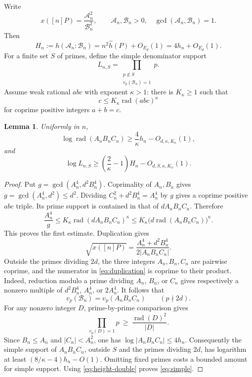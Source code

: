 \documentclass[11pt,a4paper]{article}
\newtheorem{lemma}[theorem]{Lemma}
\DeclareMathOperator{\rad}{rad}
\begin{document}
Write
\[
 x([n]P)=\frac{\mathcal A_n^2}{\mathcal B_n^2},\qquad
 \mathcal A_n,\mathcal B_n>0,\quad
 \gcd(\mathcal A_n,\mathcal B_n)=1.
\]
Then
\begin{equation}\label{eq:height-double}
 H_n:=h(\mathcal A_n:\mathcal B_n)
    =n^2\widehat h(P)+O_{E_d}(1)=4h_n+O_{E_d}(1).
\end{equation}
For a finite set $S$ of primes, define the simple denominator support
\[
                 L_{n,S}=\prod_{\substack{p\notin S\\v_p(\mathcal B_n)=1}}p.
\]
Assume weak rational $abc$ with exponent $\kappa>1$: there is
$K_\kappa\ge1$ such that
\[
 c\le K_\kappa\rad(abc)^\kappa
\]
for coprime positive integers $a+b=c$.

\begin{lemma}\label{lem:radical}
Uniformly in $n$,
\[
 \log\rad(A_nB_nC_n)\ge\frac4\kappa h_n
                              -O_{d,\kappa,K_\kappa}(1),
\]
and
\begin{equation}\label{eq:simple}
 \log L_{n,S}\ge\left(\frac2\kappa-1\right)H_n
                              -O_{d,S,\kappa,K_\kappa}(1).
\end{equation}
\end{lemma}
\begin{proof}
Put $g=\gcd(A_n^4,d^2B_n^4)$. Coprimality of $A_n,B_n$ gives
$g=\gcd(A_n^4,d^2)\le d^2$. Dividing
$C_n^2+d^2B_n^4=A_n^4$ by $g$ gives a coprime positive $abc$ triple.
Its prime support is contained in that of $dA_nB_nC_n$. Therefore
\[
 \frac{A_n^4}{g}\le K_\kappa\rad(dA_nB_nC_n)^\kappa
                  \le K_\kappa\bigl(d\rad(A_nB_nC_n)\bigr)^\kappa.
\]
This proves the first estimate. Duplication gives
\begin{equation}\label{eq:duplication}
 \sqrt{x([n]P)}=\frac{A_n^4+d^2B_n^4}{2|A_nB_nC_n|}.
\end{equation}
Outside the primes dividing $2d$, the three integers $A_n,B_n,C_n$
are pairwise coprime, and the numerator in \eqref{eq:duplication}
is coprime to their product. Indeed, reduction modulo a prime
dividing $A_n$, $B_n$, or $C_n$ gives respectively a nonzero
multiple of $d^2B_n^4$, $A_n^4$, or $2A_n^4$.
It follows that
\[
 v_p(\mathcal B_n)=v_p(A_nB_nC_n)\qquad(p\nmid2d).
\]
For any nonzero integer $D$, prime-by-prime comparison gives
\[
       \prod_{v_p(D)=1}p\ \ge\ \frac{\rad(D)^2}{|D|}.
\]
Since $B_n\le A_n$ and $|C_n|<A_n^2$, one has
$\log|A_nB_nC_n|\le4h_n$. Consequently the simple support of
$A_nB_nC_n$, outside $S$ and the primes dividing $2d$, has logarithm
at least $(8/\kappa-4)h_n-O(1)$.
Omitting fixed primes costs a bounded amount for simple support.
Using \eqref{eq:height-double} proves \eqref{eq:simple}.
\end{proof}
\end{document}
